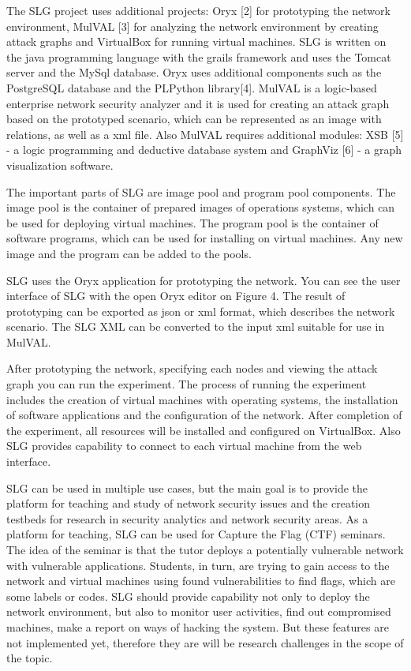 The SLG project uses additional projects: Oryx [2] for prototyping the network environment, MulVAL [3] for analyzing the network environment by creating attack graphs and VirtualBox for running virtual machines. SLG is written on the java programming language with the grails framework and uses the Tomcat server and the MySql database. Oryx uses additional components such as the PostgreSQL database and the PLPython library[4]. MulVAL is a logic-based enterprise network security analyzer and it is used for creating an attack graph based on the prototyped scenario, which can be represented as an image with relations, as well as a xml file. Also MulVAL requires additional modules: XSB [5] - a logic programming and deductive database system and GraphViz [6] - a graph visualization software. 

The important parts of SLG are image pool and program pool components. The image pool is the container of prepared images of operations systems, which can be used for deploying virtual machines. The program pool is the container of software programs, which can be used for installing on virtual machines. Any new image and the program can be added to the pools.

SLG uses the Oryx application for prototyping the network. You can see the user interface of SLG with the open Oryx editor on Figure 4. The result of prototyping can be exported as json or xml format, which describes the network scenario. The SLG XML can be converted to the input xml suitable for use in MulVAL. 

After prototyping the network, specifying each nodes and viewing the attack graph you can run the experiment. The process of running the experiment includes the creation of virtual machines with operating systems, the installation of software applications and the configuration of the network. After completion of the experiment, all resources will be installed and configured on VirtualBox. Also SLG provides capability to connect to each virtual machine from the web interface. 


SLG can be used in multiple use cases, but the main goal is to provide the platform for teaching and study of network security issues and the creation testbeds for research in security analytics and network security areas. 
As a platform for teaching, SLG can be used for Capture the Flag (CTF) seminars. The idea of the seminar is that the tutor deploys a potentially vulnerable network with vulnerable applications. Students, in turn, are trying to gain access to the network and virtual machines using found vulnerabilities to find flags, which are some labels or codes. SLG should provide capability not only to deploy the network environment, but also to monitor user activities, find out compromised machines, make a report on ways of hacking the system. But these features are not implemented yet, therefore they are will be research challenges in the scope of the topic.
  
